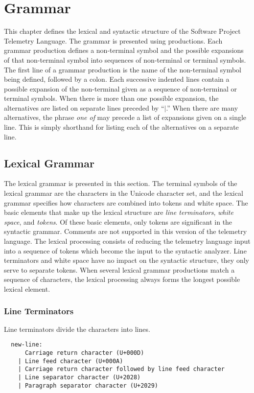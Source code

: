 \section{Grammar}  \label{TelemetryLanguageSpecification:Grammar}

This chapter defines the lexical and syntactic structure of the Software Project Telemetry Language. The grammar is presented using productions. Each grammar production defines a non-terminal symbol and the possible expansions of that non-terminal symbol into sequences of non-terminal or terminal symbols. The first line of a grammar production is the name of the non-terminal symbol being defined, followed by a colon. Each successive indented lines contain a possible expansion of the non-terminal given as a sequence of non-terminal or terminal symbols. When there is more than one possible expansion, the alternatives are listed on separate lines preceded by ``$|$.'' When there are many alternatives, the phrase \textit{one of} may precede a list of expansions given on a single line. This is simply shorthand for listing each of the alternatives on a separate line.


\subsection{Lexical Grammar}

The lexical grammar is presented in this section. The terminal symbols of the lexical grammar are the characters in the Unicode character set, and the lexical grammar specifies how characters are combined into tokens and white space. The basic elements that make up the lexical structure are \textit{line terminators}, \textit{white space}, and \textit{tokens}. Of these basic elements, only tokens are significant in the syntactic grammar. Comments are not supported in this version of the telemetry language. The lexical processing consists of reducing the telemetry language input into a sequence of tokens which become the input to the syntactic analyzer. Line terminators and white space  have no impact on the syntactic structure, they only serve to separate tokens. When several lexical grammar productions match a sequence of characters, the lexical processing always forms the longest possible lexical element.


\subsubsection{Line Terminators}
Line terminators divide the characters into lines.
\begin{verbatim}
  new-line:
      Carriage return character (U+000D)
    | Line feed character (U+000A)
    | Carriage return character followed by line feed character
    | Line separator character (U+2028)
    | Paragraph separator character (U+2029)
\end{verbatim}


